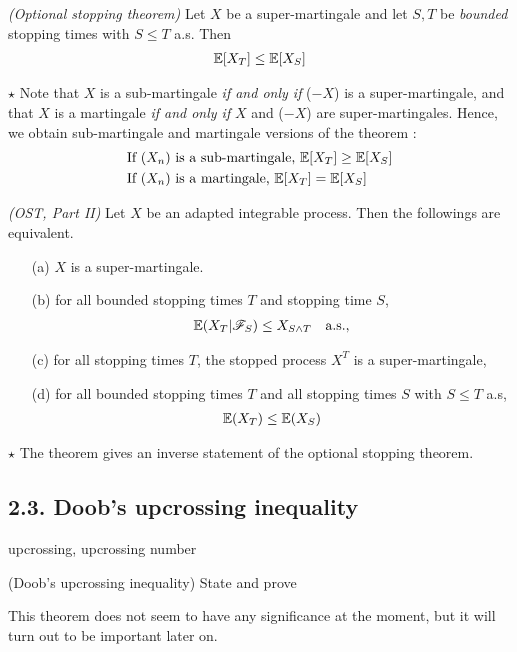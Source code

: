 \documentclass[10pt,a4paper]{report}
\begin{document}
 \emph{(Optional stopping theorem)} Let $X$ be a super-martingale and let $S,T$ be \emph{bounded} stopping times with $S \leq T$ a.s. Then
\begin{align*}
\mathbb{E}[X_T] \leq \mathbb{E}[X_S]
\end{align*}
\s

$\star$ Note that $X$ is a sub-martingale \emph{if and only if} ($-X$) is a super-martingale, and that $X$ is a martingale \emph{if and only if} $X$ and ($-X$) are super-martingales. Hence, we obtain sub-martingale and martingale versions of the theorem :
\begin{align*}
&\text{If } (X_n) \text{ is a sub-martingale, } \mathbb{E}[X_T] \geq \mathbb{E}[X_S] \\
&\text{If } (X_n) \text{ is a martingale, } \mathbb{E}[X_T] = \mathbb{E}[X_S]
\end{align*}
\s

 \emph{(OST, Part II)} Let $X$ be an adapted integrable process. Then the followings are equivalent.
\begin{itemize}
\item[(a)] $X$ is a super-martingale. 
\item[(b)] for all bounded stopping times $T$ and stopping time $S$,
\begin{align*}
\mathbb{E}(X_T |\mathscr{F}_S) \leq X_{S\wedge T} \quad \text{a.s.},
\end{align*}
\item[(c)] for all stopping times $T$, the stopped process $X^T$ is a super-martingale,
\item[(d)] for all bounded stopping times $T$ and all stopping times $S$ with $S\leq T$ a.s,
\begin{align*}
\mathbb{E}(X_T) \leq \mathbb{E}(X_S)
\end{align*}
\end{itemize}

$\star$ The theorem gives an inverse statement of the optional stopping theorem.
\s

\subsection*{2.3. Doob's upcrossing inequality}

upcrossing, upcrossing number

(Doob's upcrossing inequality) State and prove
\s

This theorem does not seem to have any significance at the moment, but it will turn out to be important later on.
\end{document}
